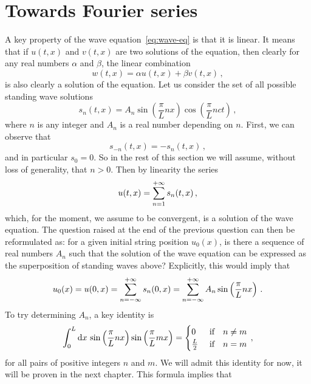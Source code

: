 \section{Towards Fourier series}
A key property of the wave equation~\cref{eq:wave-eq} is that it is linear. It means that
if $u(t,x)$ and $v(t,x)$ are two solutions of the equation, then clearly for any real
numbers $\alpha$ and $\beta$, the linear combination
\begin{equation}
  w(t,x)=\alpha u(t,x)+\beta v(t,x)\,,
\end{equation}
is also clearly a solution of the equation. Let us consider the set of all possible
standing wave solutions
\begin{equation}
  s_n(t,x)=A_n\sin\left(\frac{\pi}{L}nx\right)\cos\left(\frac{\pi}{L}nct\right)\,,
\end{equation}
where $n$ is any integer and $A_n$ is a real number depending on $n$. First, we can
observe that
\begin{equation}
  s_{-n}(t,x)=-s_n(t,x)\,,
\end{equation}
and in particular $s_0=0$. So in the rest of this section we will assume, without loss of
generality, that $n>0$. Then by linearity the series
\begin{equation}
  u(t,x)=\sum_{n=1}^{+\infty}s_n(t,x)\,,
\end{equation}
which, for the moment, we assume to be convergent, is a solution of the wave equation. The
question raised at the end of the previous question can then be reformulated as: for a
given initial string position $u_0(x)$, is there a sequence of real numbers $A_n$ such
that the solution of the wave equation can be expressed as the superposition of standing
waves above? Explicitly, this would imply that
\begin{equation}
  u_0(x)=u(0,x)=\sum_{n=-\infty}^{+\infty}s_n(0,x)=\sum_{n=-\infty}^{+\infty}A_n\sin\left(\frac{\pi}{L}nx\right)\,.
\end{equation}
To try determining $A_n$, a key identity is
\begin{equation}
  \int_{0}^{L}\mathrm{d} x\,\sin\left(\frac{\pi}{L}nx\right)\sin\left(\frac{\pi}{L}mx\right)
  =
  \begin{cases}
    0&~\text{if}\quad n\neq m\\
    \frac{L}{2}&~\text{if}\quad n=m
  \end{cases}
  \,,
\end{equation}
for all pairs of positive integers $n$ and $m$. We will admit this identity for now, it
will be proven in the next chapter. This formula implies that
